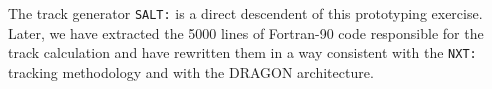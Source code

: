 \vskip 0.08cm

The track generator {\tt SALT:} is a direct descendent of this prototyping exercise.
Later, we have extracted the 5000 lines of Fortran-90 code responsible for the track
calculation and have rewritten them in a way consistent with the {\tt NXT:} tracking
methodology and with the DRAGON architecture.

